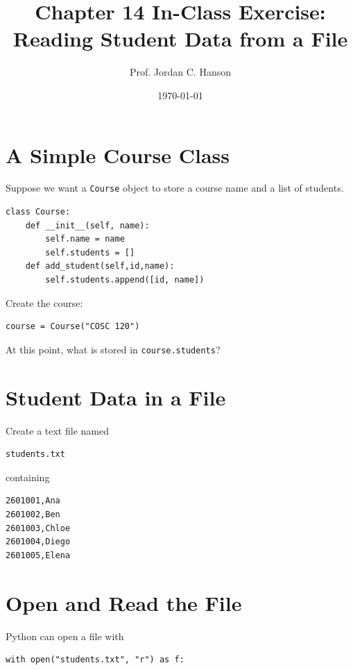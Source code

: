 \documentclass[11pt]{article}
\begin{document}
\twocolumn

\title{Chapter 14 In-Class Exercise: Reading Student Data from a File}
\author{Prof. Jordan C. Hanson}
\date{\today}
\maketitle

\section{A Simple Course Class}

Suppose we want a \texttt{Course} object to store a course name and a list of students.

\begin{verbatim}
class Course:
    def __init__(self, name):
        self.name = name
        self.students = []
    def add_student(self,id,name):
        self.students.append([id, name])
\end{verbatim}

Create the course:

\begin{verbatim}
course = Course("COSC 120")
\end{verbatim}

At this point, what is stored in \texttt{course.students}?

\section{Student Data in a File}

Create a text file named

\begin{verbatim}
students.txt
\end{verbatim}

containing

\begin{verbatim}
2601001,Ana
2601002,Ben
2601003,Chloe
2601004,Diego
2601005,Elena
\end{verbatim}

\section{Open and Read the File}

Python can open a file with

\begin{verbatim}
with open("students.txt", "r") as f:
\end{verbatim}
\end{document}
